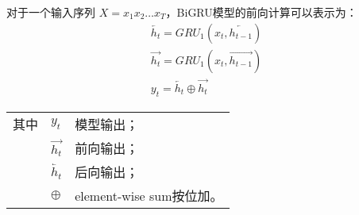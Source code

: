 对于一个输入序列 $X = x_1 x_2 \dots x_T$，BiGRU模型的前向计算可以表示为：
\begin{gather}
  \overleftarrow{h_t} = GRU_1(x_t,\overleftarrow{h_{t-1}}) \label{eq:bigru_htleft} \\
  \overrightarrow{h_t} = GRU_1(x_t,\overrightarrow{h_{t-1}}) \label{eq:bigru_htright} \\
  y_t = \overleftarrow{h_t} \oplus \overrightarrow{h_t} \label{eq:bigru_out}
\end{gather}
\begin{flushleft}
  \renewcommand\arraystretch{1.25}
  \begin{tabularx}{\textwidth}{@{}>{\normalsize\rm}l@{\quad}>{\normalsize\rm}l@{——}>{\normalsize\rm}X@{}}
  其中
  &  $y_t$ &模型输出；\\
  &  $\overrightarrow{h_t}$ &前向输出；\\
  &  $\overleftarrow{h_t} $ &后向输出；\\
  &  $\oplus$ & element-wise sum按位加。\\
  \end{tabularx}\vspace{.5ex}%
\end{flushleft}

